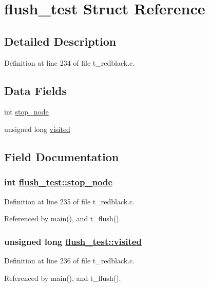 \hypertarget{structflush__test}{
\section{flush\_\-test Struct Reference}
\label{structflush__test}
}


\subsection{Detailed Description}




Definition at line 234 of file t\_\-redblack.c.\subsection*{Data Fields}
\begin{CompactItemize}
\item 
int \hyperlink{structflush__test_o0}{stop\_\-node}
\item 
unsigned long \hyperlink{structflush__test_o1}{visited}
\end{CompactItemize}


\subsection{Field Documentation}
\hypertarget{structflush__test_o0}{
\subsubsection[stop\_\-node]{\setlength{\rightskip}{0pt plus 5cm}int \hyperlink{structflush__test_o0}{flush\_\-test::stop\_\-node}}}
\label{structflush__test_o0}




Definition at line 235 of file t\_\-redblack.c.

Referenced by main(), and t\_\-flush().\hypertarget{structflush__test_o1}{
\subsubsection[visited]{\setlength{\rightskip}{0pt plus 5cm}unsigned long \hyperlink{structflush__test_o1}{flush\_\-test::visited}}}
\label{structflush__test_o1}




Definition at line 236 of file t\_\-redblack.c.

Referenced by main(), and t\_\-flush().